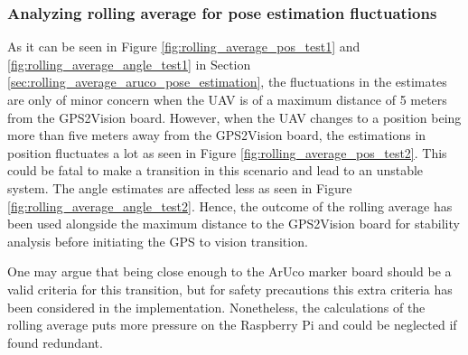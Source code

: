 \documentclass[../Head/report.tex]{subfiles}
\begin{document}
\subsubsection*{Analyzing rolling average for pose estimation fluctuations}
As it can be seen in Figure \ref{fig:rolling_average_pos_test1} and \ref{fig:rolling_average_angle_test1} in Section \ref{sec:rolling_average_aruco_pose_estimation}, the fluctuations in the estimates are only of minor concern when the UAV is of a maximum distance of 5 meters from the GPS2Vision board. However, when the UAV changes to a position being more than five meters away from the GPS2Vision board, the estimations in position fluctuates a lot as seen in Figure \ref{fig:rolling_average_pos_test2}. This could be fatal to make a transition in this scenario and lead to an unstable system. The angle estimates are affected less as seen in Figure \ref{fig:rolling_average_angle_test2}. Hence, the outcome of the rolling average has been used alongside the maximum distance to the GPS2Vision board for stability analysis before initiating the GPS to vision transition. 

One may argue that being close enough to the ArUco marker board should be a valid criteria for this transition, but for safety precautions this extra criteria has been considered in the implementation. Nonetheless, the calculations of the rolling average puts more pressure on the Raspberry Pi and could be neglected if found redundant.     
\end{document}
